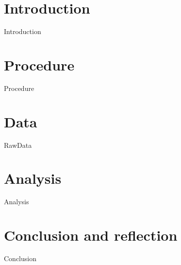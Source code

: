 \documentclass[12pt,a4paper]{article}
\begin{document}
\tableofcontents

\section{Introduction}
{Introduction}

\section{Procedure}
{Procedure}

\section{Data}
{RawData}


\section{Analysis}
{Analysis}


\section{Conclusion and reflection}
{Conclusion}


\end{document}
